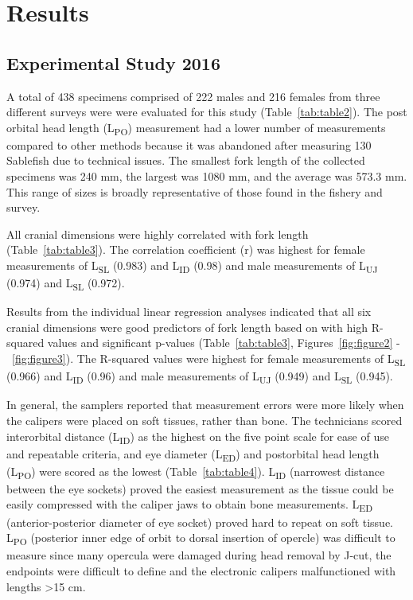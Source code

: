 \documentclass[12pt]{article}\usepackage[]{graphicx}\usepackage[]{color}
\begin{document}
\hypertarget{results}{%
\section{Results}\label{results}}

\hypertarget{experimental-study-2016-1}{%
\subsection{Experimental Study 2016}\label{experimental-study-2016-1}}

A total of 438 specimens comprised of 222 males and 216 females from three different surveys were were evaluated for this study (Table~\ref{tab:table2}). The post orbital head length (L\textsubscript{PO}) measurement had a lower number of measurements compared to other methods because it was abandoned after measuring 130 Sablefish due to technical issues. The smallest fork length of the collected specimens was 240 mm, the largest was 1080 mm, and the average was 573.3 mm. This range of sizes is broadly representative of those found in the fishery and survey.

All cranial dimensions were highly correlated with fork length (Table~\ref{tab:table3}). The correlation coefficient (r) was highest for female measurements of L\textsubscript{SL} (0.983) and L\textsubscript{ID} (0.98) and male measurements of L\textsubscript{UJ} (0.974) and L\textsubscript{SL} (0.972).

Results from the individual linear regression analyses indicated that all six cranial dimensions were good predictors of fork length based on with high R-squared values and significant p-values (Table~\ref{tab:table3}, Figures~\ref{fig:figure2} -~\ref{fig:figure3}). The R-squared values were highest for female measurements of L\textsubscript{SL} (0.966) and L\textsubscript{ID} (0.96) and male measurements of L\textsubscript{UJ} (0.949) and L\textsubscript{SL} (0.945).

In general, the samplers reported that measurement errors were more likely when the calipers were placed on soft tissues, rather than bone. The technicians scored interorbital distance (L\textsubscript{ID}) as the highest on the five point scale for ease of use and repeatable criteria, and eye diameter (L\textsubscript{ED}) and postorbital head length (L\textsubscript{PO}) were scored as the lowest (Table~\ref{tab:table4}). L\textsubscript{ID} (narrowest distance between the eye sockets) proved the easiest measurement as the tissue could be easily compressed with the caliper jaws to obtain bone measurements. L\textsubscript{ED} (anterior-posterior diameter of eye socket) proved hard to repeat on soft tissue. L\textsubscript{PO} (posterior inner edge of orbit to dorsal insertion of opercle) was difficult to measure since many opercula were damaged during head removal by J-cut, the endpoints were difficult to define and the electronic calipers malfunctioned with lengths \textgreater15 cm.
\end{document}
